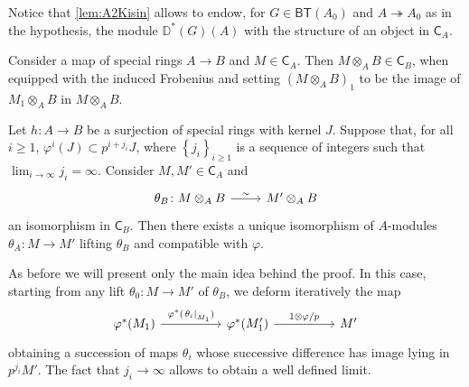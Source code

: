 \begin{rem}[]
	Notice that \cref{lem:A2Kisin} allows to endow,
	for $G \in \mathsf{BT}(A_0)$ and $A \twoheadrightarrow A_0$ as in the hypothesis,
	the module $\mathbb{D}^*(G)(A)$ with the structure of an object in $\mathsf{C}_A$.
\end{rem}


\begin{defn}[]
	Consider a map of special rings $A \to B$ and $M \in \mathsf{C}_A$.
	Then $M \otimes_A B \in \mathsf{C}_B$, when equipped with
	the induced Frobenius %
	and setting
	$\left( M \otimes_A B \right)_1$ to be the image of
	$M_1 \otimes_A B$ in $M \otimes_A B$.
\end{defn}


\begin{lem}\label{lem:A4Kisin}
	Let $h\colon A \to B$ be a surjection of special rings with kernel $J$.
	Suppose that, for all $i \geq 1$, $\varphi^i(J) \subset p^{i + j_i} J$,
	where $\left\{ j_i \right\}_{i \geq 1}$ is a sequence of integers
	such that $\lim_{i \to \infty} j_i = \infty$.
	Consider $M, M' \in \mathsf{C}_A$ and
	\begin{equation*}
	\begin{tikzcd}[row sep = 0ex
		,/tikz/column 1/.append style={anchor=base east}
		,/tikz/column 2/.append style={anchor=base west}]
		\theta_B\colon M \otimes_A B 
		\arrow[r, "\sim", rightarrow] &
		M' \otimes_A B
	\end{tikzcd}
	\end{equation*} 
	an isomorphism in $\mathsf{C}_B$.
	Then there exists a unique isomorphism of $A$-modules
	$\theta_A\colon M \to M'$ lifting $\theta_B$ and compatible with $\varphi$.
\end{lem} 


\begin{rem}[]
	As before we will present only the main idea behind the proof.
	In this case, starting from any lift $\theta_0\colon M \to M'$
	of $\theta_B$, we deform iteratively the map
	\begin{equation*}
	\begin{tikzcd}[column sep=4.8em]
		\varphi^*(M_1) \arrow[r, "\varphi^*(\left.\theta_i\right|_{ M_1 })", rightarrow] &
		\varphi^*(M_1') \arrow[r, "1 \otimes \varphi/p", rightarrow] &
		M'
	\end{tikzcd}
	\end{equation*}
	obtaining a succession of maps $\theta_i$ whose successive difference
	has image lying in $p^{j_i}M'$.
	The fact that $j_i \to \infty$ allows to obtain a well defined limit.
\end{rem}


